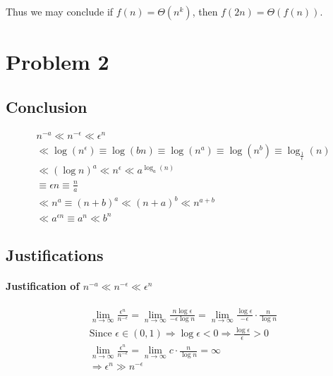 \documentclass[12pt]{article}
\begin{document}
Thus we may conclude if $f(n) = \Theta(n^k)$, then $f(2n) = \Theta(f(n))$.

\section{Problem 2}

\subsection{Conclusion}

\begin{gather}
     n^{-a} \ll n^{-\epsilon} \ll \epsilon^n  \\
    \ll \log(n^\epsilon) \equiv \log(bn) \equiv \log(n^a) \equiv \log(n^b) \equiv \log_{\frac{1}{\epsilon}}(n)\\
    \ll  (\log n)^a \ll n^{\epsilon} \ll a^{\log_a(n)} \\
    \equiv \epsilon n \equiv \frac{n}{a} \\
    \ll n^a \equiv (n+b)^a \ll (n+a)^b \ll n^{a+b} \\
    \ll a^{\epsilon n} \equiv a^n \ll b^n
\end{gather}


\subsection{Justifications}


\paragraph{Justification of $n^{-a} \ll n^{-\epsilon} \ll \epsilon^n$\newline}

\begin{gather}
    \lim\limits_{n \to \infty} \frac{\epsilon^n}{n^{-\epsilon}} = \lim\limits_{n \to \infty} \frac{n\log \epsilon}{-\epsilon \log n} = \lim\limits_{n \to \infty} \frac{\log \epsilon}{-\epsilon} \cdot \frac{n}{\log n} \\
    \text{Since } \epsilon \in (0, 1) \Rightarrow \log \epsilon < 0 \Rightarrow \frac{\log \epsilon}{\epsilon} > 0 \nonumber\\
    \lim\limits_{n \to \infty} \frac{\epsilon^n}{n^{-\epsilon}} = \lim\limits_{n \to \infty} c \cdot \frac{n}{\log n} = \infty \\
    \Rightarrow \epsilon^n \gg n^{-\epsilon}
\end{gather}
\end{document}
